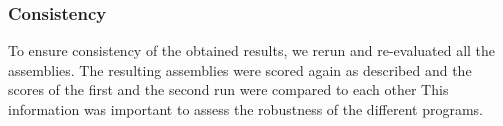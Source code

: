 \documentclass{bmcart}
\newcommand{\todo}[1]{\textcolor{red}{\bfseries(ToDO: #1})}
\begin{document}
\subsubsection*{Consistency}
To ensure consistency of the obtained results, we rerun and re-evaluated all the assemblies. %
The resulting assemblies were scored again as described and the scores of the first and the second run were compared to each other
This information was important to assess the robustness of the different programs.

\end{document}
